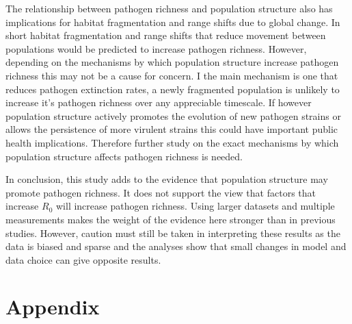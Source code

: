 The relationship between pathogen richness and population structure also has implications for habitat fragmentation and range shifts due to global change.
In short habitat fragmentation and range shifts that reduce movement between populations would be predicted to increase pathogen richness.
However, depending on the mechanisms by which population structure increase pathogen richness this may not be a cause for concern.
I the main mechanism is one that reduces pathogen extinction rates, a newly fragmented population is unlikely to increase it's pathogen richness over any appreciable timescale.
If however population structure actively promotes the evolution of new pathogen strains or allows the persistence of more virulent strains this could have important public health implications.
Therefore further study on the exact mechanisms by which population structure affects pathogen richness is needed. 


In conclusion, this study adds to the evidence that population structure may promote pathogen richness.
It does not support the view that factors that increase $R_0$ will increase pathogen richness.
Using larger datasets and multiple measurements makes the weight of the evidence here stronger than in previous studies.
However, caution must still be taken in interpreting these results as the data is biased and sparse and the analyses show that small changes in model and data choice can give opposite results.







\section{Appendix}















